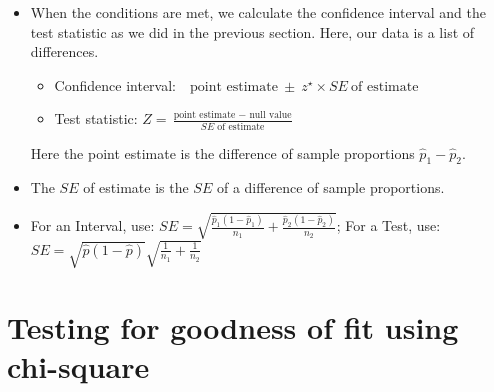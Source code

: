 \begin{itemize}
\item When the conditions are met, we calculate the confidence interval and the test statistic as we did in the previous section.  Here, our data is a list of differences.

\begin{itemize}
\setlength{\itemsep}{2mm}
\item[] Confidence interval:\ \  $\text{point estimate}\ \pm\ z^{\star} \times SE\ \text{of estimate}$
\item[] Test statistic:  $Z = \frac{\text{point estimate } - \text{ null value}}{SE \text{ of estimate}}$ 
\end{itemize}
Here the point estimate is the difference of sample proportions $\hat{p}_1 - \hat{p}_2$.
\item[] The $SE$ of estimate is the $SE$ of a difference of sample proportions.
\item[] \quad \quad For an Interval, use:  $SE = \sqrt{\frac{\hat{p}_1(1-\hat{p}_1)}{n_1} + \frac{\hat{p}_2(1-\hat{p}_2)}{n_2}}$; \quad For a Test, use:  $SE = \sqrt{\hat{p}(1-\hat{p})}\sqrt{\frac{1}{n_1} + \frac{1}{n_2}}$   
\end{itemize}


{}


\section[Testing for goodness of fit using chi-square]{Testing for goodness of fit using chi-square }

\label{oneWayChiSquare}


